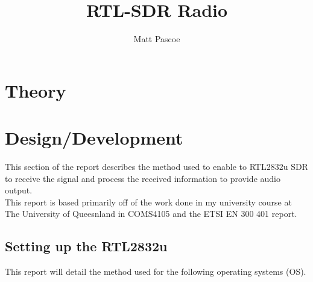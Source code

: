 \documentclass[12pt]{article}
\begin{document}
\title{RTL-SDR Radio}
\author{Matt Pascoe}
\maketitle
\newpage

\tableofcontents 
\listoffigures
\listoftables
\newpage 

\section{Theory}


\section{Design/Development}
This section of the report describes the method used to enable to RTL2832u SDR to receive the signal and process the received information to provide audio output.\\
This report is based primarily off of the work done in my university course at The University of Queesnland in COMS4105 and the ETSI EN 300 401 \cite{etsi} report.

\subsection{Setting up the RTL2832u}
This report will detail the method used for the following operating systems (OS).
\end{document}
